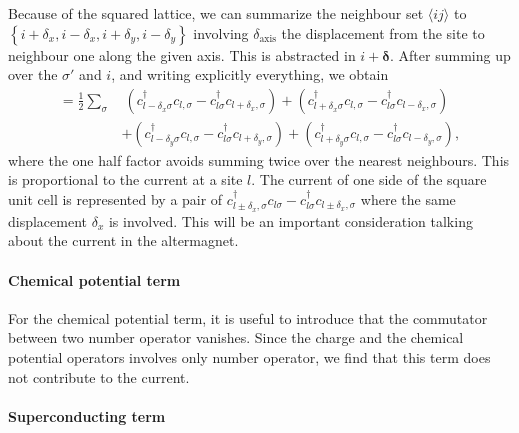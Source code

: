\documentclass[../main.tex]{subfile}
\begin{document}
Because of the squared lattice, we can summarize the neighbour set $\langle ij\rangle$ to $\left\{ i + \delta_x , i - \delta_x, i + \delta_y, i - \delta_y   \right\}$ involving
$\delta_{\text{axis}}$ the displacement from the site to neighbour one along the given axis. This is abstracted in $i+ \bm{\delta}$.
After summing up over the $\sigma'$ and $i$, and writing explicitly everything, we obtain 
\begin{equation}\label{Eq:CurrentHoppingCommu}
    \begin{aligned}
        =\frac{1}{2} \sum_{\sigma} 
       &~(c_{l-\delta_x\sigma}^{\dagger}c_{l,\sigma} -c_{l\sigma}^{\dagger}c_{l+\delta_x,\sigma})  
       +(c_{l+\delta_x\sigma}^{\dagger}c_{l,\sigma} -c_{l\sigma}^{\dagger}c_{l-\delta_x,\sigma})\\
       &+(c_{l-\delta_y\sigma}^{\dagger}c_{l,\sigma} -c_{l\sigma}^{\dagger}c_{l+\delta_y,\sigma})
       +(c_{l+\delta_y\sigma}^{\dagger}c_{l,\sigma} -c_{l\sigma}^{\dagger}c_{l-\delta_y,\sigma}),
\end{aligned}
\end{equation}
where the one half factor avoids summing twice over the nearest neighbours. This is proportional to the current at a site $l$.
The current of one side of the square unit cell is represented by a pair of $c_{l\pm\delta_x,\sigma}^{\dagger}c_{l\sigma} -c_{l\sigma}^{\dagger}c_{l\pm\delta_x,\sigma}$
where the same displacement $\delta_x$ is involved. This will be an important consideration talking about the current in the altermagnet.\\

\paragraph{Chemical potential term} $~$\\

For the chemical potential term, it is useful to introduce that the commutator between two number operator vanishes. 
Since the charge and the chemical potential operators involves only number operator, we find that this term does not contribute
to the current.

\paragraph{Superconducting term} $~$\\
\end{document}
